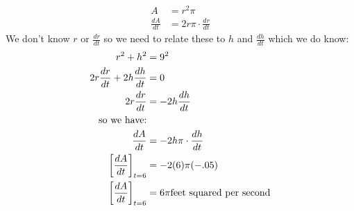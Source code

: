 \documentclass[nooutcomes]{ximera}
\begin{document}
\begin{problem}
\begin{freeResponse}
	\begin{align*}
	A&=r^2\pi\\
	\frac{dA}{dt}&=2r\pi \cdot \frac{dr}{dt} 
	\end{align*}
	We don't know $r$ or $\frac{dr}{dt}$ so we need to relate these to $h$ and $\frac{dh}{dt}$ which we do know:\\
	\begin{align*}
	r^2+h^2&=9^2\\
	2r\frac{dr}{dt}+2h\frac{dh}{dt}&=0\\
	2r\frac{dr}{dt}&=-2h\frac{dh}{dt}\\
	\text{so we have:}&\\
	\frac{dA}{dt}&=-2h\pi \cdot \frac{dh}{dt} \\
	\bigg[ \frac{dA}{dt} \bigg]_{t=6}&=-2(6)\pi (-.05)\\
	\bigg[ \frac{dA}{dt} \bigg]_{t=6}&=6\pi \text{feet squared per second}
	\end{align*}

\end{freeResponse}
\end{problem}
\end{document}
